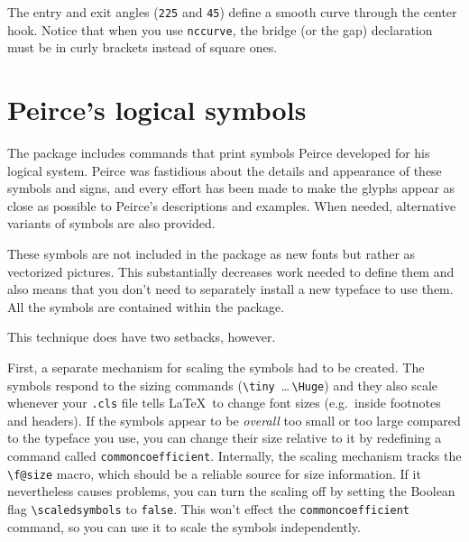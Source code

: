 \documentclass[a4paper,justified]{tufte-handout}
\begin{document}
\noindent The entry and exit angles (\verb|225| and \verb|45|) define a smooth curve through the center hook. Notice that when you use \verb|nccurve|, the bridge (or the gap) declaration must be in curly brackets instead of square ones.

\newpage
{}%
\section{\hspace*{-15pt}Peirce's logical symbols}

The package includes commands that print symbols Peirce developed for his logical system. Peirce was fastidious about the details and appearance of these symbols and signs, and every effort has been made to make the glyphs appear as close as possible to Peirce's descriptions and examples. When needed, alternative variants of symbols are also provided.\label{symbolspage}

These symbols are not included in the package as new fonts but rather as vectorized pictures. This substantially decreases work need\-ed to define them and also means that you don't need to separately install a new typeface to use them. All the symbols are contained within the package.\medskip

\noindent This technique does have two setbacks, however.

First, a separate mechanism for scaling the symbols had to be created. The symbols respond to the sizing commands (\verb|\tiny|\ \dots\,\verb|\Huge|) and they also scale whenever your \texttt{.cls} file tells \LaTeX\ to change font sizes (e.g.\ inside footnotes and headers). If the symbols appear to be \textit{overall} too small or too large compared to the typeface you use, you can change their size relative to it by redefining a command called \texttt{commoncoefficient}. Internally, the scaling mechanism tracks the \verb|\f@size| macro, which should be a reliable source for size information. If it nevertheless causes problems, you can turn the scaling off by setting the Boolean flag \verb|\scaledsymbols| to \texttt{false}. This won't effect the \verb|commoncoefficient| command, so you can use it to scale the symbols independently.
\end{document}
